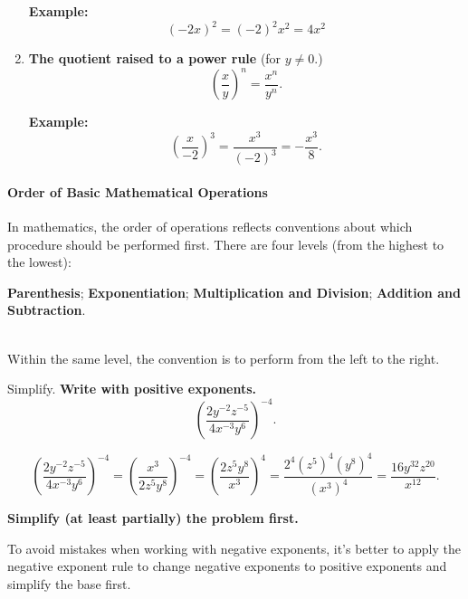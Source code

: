\begin{enumerate}
\begin{multicols}{2}
				  
			      \textbf{Example:}
				  \[\left(-2x\right)^{2}=(-2)^2x^2=4x^2\] 
		      \end{multicols}
		\item 
		\begin{multicols}{2}
			      \textbf{The quotient raised to a power rule} (for $y\neq 0$.)
			      \[\left(\dfrac{x}{y}\right)^n=\dfrac{x^n}{y^n}.\]

			      \textbf{Example:}
			      \[
					  \left(\dfrac{x}{-2}\right)^{3}=\dfrac{x^3}{(-2)^3}=-\dfrac{x^3}{8}.
					\]
			  \end{multicols}
			  
	\end{enumerate}



\paragraph*{Order of Basic Mathematical Operations}
	In mathematics, the order of operations reflects conventions about which procedure should be performed first. There are four levels (from the highest to the lowest):\\
	\centerline{\textbf{Parenthesis}; \textbf{Exponentiation}; \textbf{Multiplication and Division}; \textbf{Addition and Subtraction}.} \\
	Within the same level, the convention is to perform from the left to the right.


	\begin{example}
		Simplify. \textbf{Write with positive exponents.} 
		$$
		\left(\dfrac{2y^{-2}z^{-5}}{4x^{-3}y^6}\right)^{-4}.
		$$
	\end{example}
	\begin{solution}
		$$
		\left(\dfrac{2y^{-2}z^{-5}}{4x^{-3}y^6}\right)^{-4}
		=\left(\dfrac{x^3}{2z^{5}y^8}\right)^{-4}
		=\left(\dfrac{2z^{5}y^8}{x^3}\right)^4
		=\dfrac{2^4(z^{5})^4(y^8)^4}{(x^3)^4}
		=\dfrac{16y^{32}z^{20}}{x^{12}}.
		$$
	\end{solution}

	\begin{trick} \textbf{Simplify (at least partially) the problem first.}

		To avoid mistakes when working with negative exponents, it's better to apply the negative exponent rule to change negative exponents to positive exponents and simplify the base first.
	\end{trick}

